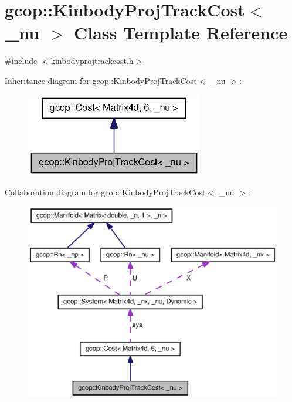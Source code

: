 \section{gcop\-:\-:\-Kinbody\-Proj\-Track\-Cost$<$ \-\_\-nu $>$ \-Class \-Template \-Reference}
\label{classgcop_1_1KinbodyProjTrackCost}


{\ttfamily \#include $<$kinbodyprojtrackcost.\-h$>$}



\-Inheritance diagram for gcop\-:\-:\-Kinbody\-Proj\-Track\-Cost$<$ \-\_\-nu $>$\-:\nopagebreak
\begin{figure}[H]
\begin{center}
\leavevmode
\includegraphics[width=220pt]{classgcop_1_1KinbodyProjTrackCost__inherit__graph}
\end{center}
\end{figure}


\-Collaboration diagram for gcop\-:\-:\-Kinbody\-Proj\-Track\-Cost$<$ \-\_\-nu $>$\-:\nopagebreak
\begin{figure}[H]
\begin{center}
\leavevmode
\includegraphics[width=350pt]{classgcop_1_1KinbodyProjTrackCost__coll__graph}
\end{center}
\end{figure}
